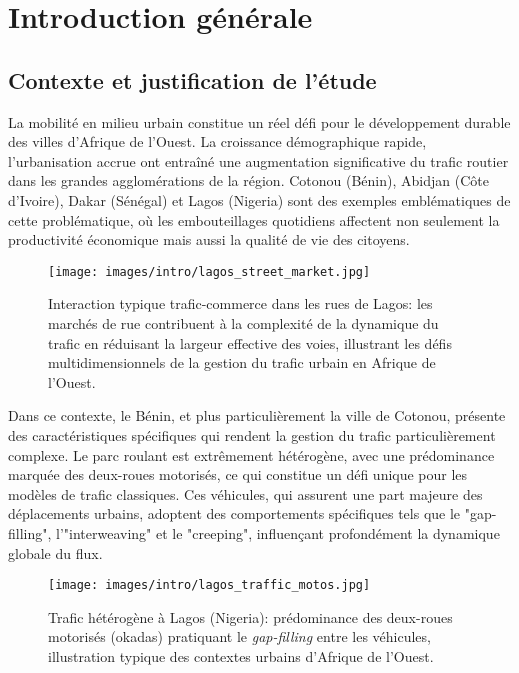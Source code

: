 ﻿\chapter*{Introduction générale}
\label{chap:intro}

\section{Contexte et justification de l'étude}
\label{sec:contexte_justification}

La mobilité en milieu urbain constitue un réel défi pour le développement durable des villes d'Afrique de l'Ouest. La croissance démographique rapide, l'urbanisation accrue ont entraîné une augmentation significative du trafic routier dans les grandes agglomérations de la région. Cotonou (Bénin), Abidjan (Côte d'Ivoire), Dakar (Sénégal) et Lagos (Nigeria) sont des exemples emblématiques de cette problématique, où les embouteillages quotidiens affectent non seulement la productivité économique mais aussi la qualité de vie des citoyens.

\begin{figure}[htbp]
    \centering
    \texttt{[image: images/intro/lagos\_street\_market.jpg]}
    \caption{Interaction typique trafic-commerce dans les rues de Lagos: les marchés de rue contribuent à la complexité de la dynamique du trafic en réduisant la largeur effective des voies, illustrant les défis multidimensionnels de la gestion du trafic urbain en Afrique de l'Ouest.}
    \label{fig:intro-street-market-traffic}
\end{figure}

Dans ce contexte, le Bénin, et plus particulièrement la ville de Cotonou, présente des caractéristiques spécifiques qui rendent la gestion du trafic particulièrement complexe. Le parc roulant est extrêmement hétérogène, avec une prédominance marquée des deux-roues motorisés, ce qui constitue un défi unique pour les modèles de trafic classiques. Ces véhicules, qui assurent une part majeure des déplacements urbains, adoptent des comportements spécifiques tels que le "gap-filling", l'"interweaving" et le "creeping", influençant profondément la dynamique globale du flux.

\begin{figure}[htbp]
    \centering
    \texttt{[image: images/intro/lagos\_traffic\_motos.jpg]}
    \caption{Trafic hétérogène à Lagos (Nigeria): prédominance des deux-roues motorisés (okadas) pratiquant le \textit{gap-filling} entre les véhicules, illustration typique des contextes urbains d'Afrique de l'Ouest.}
    \label{fig:intro-lagos-traffic}
\end{figure}

